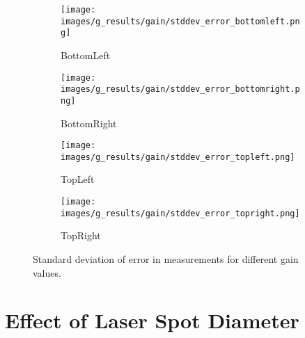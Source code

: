     \clearpage

    \begin{figure}[ht]
        \centering
        \begin{subfigure}[b]{0.46\textwidth}
            \centering
            \texttt{[image: images/g\_results/gain/stddev\_error\_bottomleft.png]}
            \caption{\textsf{BottomLeft}}
        \end{subfigure}
        \hspace{1cm}
        \begin{subfigure}[b]{0.46\textwidth}
            \centering
            \texttt{[image: images/g\_results/gain/stddev\_error\_bottomright.png]}
            \caption{\textsf{BottomRight}}
        \end{subfigure}

        \vspace{5mm}
        
        \begin{subfigure}[b]{0.46\textwidth}
            \centering
            \texttt{[image: images/g\_results/gain/stddev\_error\_topleft.png]}
            \caption{\textsf{TopLeft}}
        \end{subfigure}
        \hspace{1cm}
        \begin{subfigure}[b]{0.46\textwidth}
            \centering
            \texttt{[image: images/g\_results/gain/stddev\_error\_topright.png]}
            \caption{\textsf{TopRight}}
        \end{subfigure}

        \caption{Standard deviation of error in measurements for different gain values.}
        \label{fig:stddev_error_gain}
    \end{figure}

\section{Effect of Laser Spot Diameter}\label{section:laser_spot_dia}

